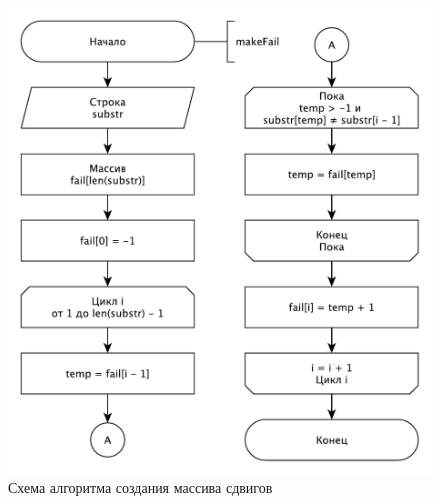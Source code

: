 \documentclass[a4paper,12pt]{article}
\begin{document}
\begin{figure}[H]
    \centering
    \includegraphics[scale=0.8]{fail}
    \caption{Схема алгоритма создания массива сдвигов}
    \label{img:fail}
\end{figure}
\end{document}
